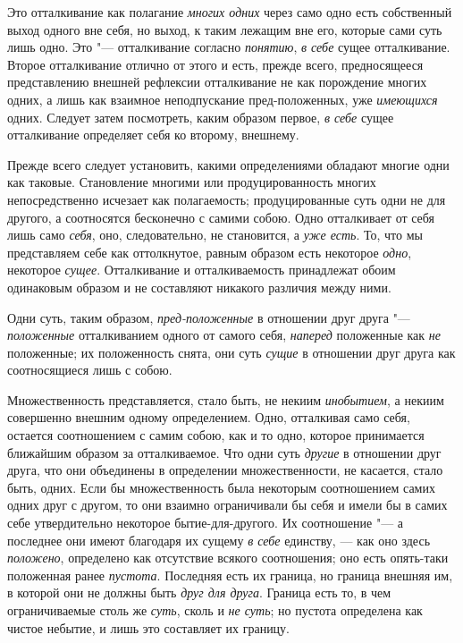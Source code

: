 Это отталкивание как полагание {\em многих одних} через
само одно есть собственный выход одного вне себя, но выход, к таким лежащим
вне его, которые сами суть лишь одно. Это "--- отталкивание согласно
{\em понятию}, {\em в себе} сущее
отталкивание. Второе отталкивание отлично от этого и есть, прежде всего,
предносящееся представлению внешней рефлексии отталкивание не как
порождение многих одних, а лишь как взаимное неподпускание пред-положенных,
уже {\em имеющихся} одних. Следует затем посмотреть,
каким образом первое, {\em в себе} сущее отталкивание
определяет себя ко второму, внешнему.

Прежде всего следует установить, какими определениями обладают многие одни
как таковые. Становление многими или продуцированность многих
непосредственно исчезает как полагаемость; продуцированные суть одни не для
другого, а соотносятся бесконечно с самими собою. Одно отталкивает от себя
лишь само {\em себя}, оно, следовательно, не
становится, а {\em уже есть}. То, что мы представляем
себе как оттолкнутое, равным образом есть некоторое
{\em одно}, некоторое {\em сущее}.
Отталкивание и отталкиваемость принадлежат обоим одинаковым образом и не
составляют никакого различия между ними.

Одни суть, таким образом, {\em пред-положенные} в
отношении друг друга "--- {\em положенные} отталкиванием
одного от самого себя, {\em наперед} положенные как
{\em не} положенные; их положенность снята, они суть
{\em сущие} в отношении друг друга как соотносящиеся
лишь с собою.

Множественность представляется, стало быть, не некиим
{\em инобытием}, а некиим совершенно внешним одному
определением. Одно, отталкивая само себя, остается соотношением с самим
собою, как и то одно, которое принимается ближайшим образом за
отталкиваемое. Что одни суть {\em другие} в отношении
друг друга, что они объединены в определении множественности, не касается,
стало быть, одних. Если бы множественность была некоторым соотношением
самих одних друг с другом, то они взаимно ограничивали бы себя и имели бы в
самих себе утвердительно некоторое бытие-для-другого. Их соотношение "--- а
последнее они имеют благодаря их сущему {\em в себе}
единству, — как оно здесь {\em положено}, определено
как отсутствие всякого соотношения; оно есть опять-таки положенная ранее
{\em пустота}. Последняя есть их граница, но граница
внешняя им, в которой они не должны быть {\em друг для
друга}. Граница есть то, в чем ограничиваемые столь же
{\em суть}, сколь и {\em не суть};
но пустота определена как чистое небытие, и лишь это составляет их границу.

